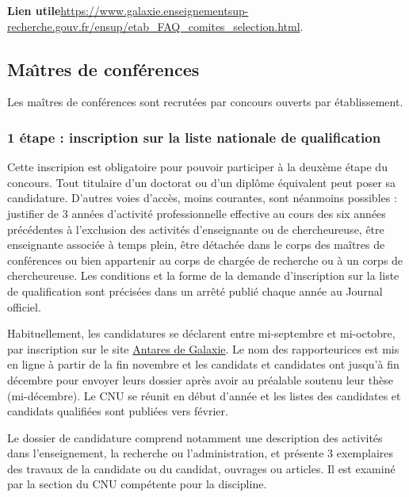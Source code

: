 \textbf{Lien utile\hspace{.5em}}\url{https://www.galaxie.enseignementsup-recherche.gouv.fr/ensup/etab_FAQ_comites_selection.html}.

\subsection{Ma\^\i tres de conf\'erences}

Les ma\^itres de conf\'erences sont recrut\'e\mp e\mp s par concours ouverts par \'etablissement.

\subsubsection*{1\iere{} \'etape : inscription sur la liste nationale de qualification}

Cette inscripion est obligatoire pour pouvoir participer \`a la
deux\`eme \'etape du concours. Tout titulaire d'un doctorat ou d'un
dipl\^ome \'equivalent peut poser sa candidature. D'autres voies
d'acc\`es, moins courantes, sont n\'eanmoins possibles : justifier de
3 ann\'ees d'activit\'e professionnelle effective au cours des six
ann\'ees pr\'ec\'edentes \`a l'exclusion des activit\'es
d'enseignant\mp e ou de chercheur\mp euse, \^etre enseignant\mp e associ\'e\mp e \`a temps
plein, \^etre d\'etach\'e\mp e dans le corps des ma\^itres de
conf\'erences ou bien appartenir au corps de charg\'e\mp e de recherche
ou \`a un corps de chercheur\mp euse. Les conditions et la forme de la
demande d'inscription sur la liste de qualification sont
pr\'ecis\'ees dans un arr\^et\'e publi\'e chaque ann\'ee au Journal
officiel.

Habituellement, les candidatures se d\'eclarent entre mi-septembre et mi-octobre, 
par inscription sur le site \href{https://galaxie.enseignementsup-recherche.gouv.fr/antares/can/index.jsp}{Antares de Galaxie}.
Le nom des rapporteur\mp ice\mp s est mis en ligne \`a partir de la fin novembre et 
les candidats et candidates ont jusqu'\`a fin d\'ecembre pour envoyer leurs dossier apr\`es avoir au pr\'ealable soutenu
leur th\`ese (mi-d\'ecembre).
Le CNU se r\'eunit en d\'ebut d'ann\'ee et les listes des candidates et candidats qualifi\'e\mp e\mp s sont publi\'ees vers f\'evrier.

Le dossier de candidature comprend notamment une
description des activit\'es dans l'enseignement, la recherche ou
l'administration, et pr\'esente 3 exemplaires des travaux de la candidate ou du candidat,
ouvrages ou articles. Il est examin\'e par la section du CNU
comp\'etente pour la discipline. 

